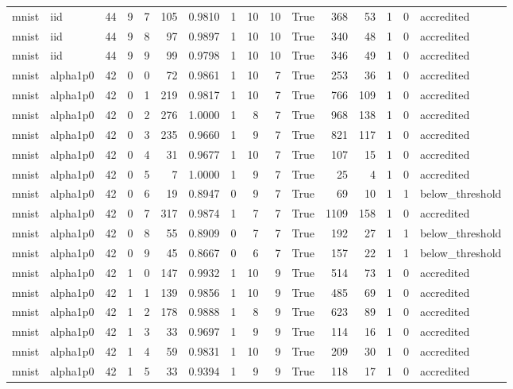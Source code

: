 \begin{tabular}{llrrrrrrrrrrrrrl}
mnist & iid & 44 & 9 & 7 & 105 & 0.9810 & 1 & 10 & 10 & True & 368 & 53 & 1 & 0 & accredited \\
mnist & iid & 44 & 9 & 8 & 97 & 0.9897 & 1 & 10 & 10 & True & 340 & 48 & 1 & 0 & accredited \\
mnist & iid & 44 & 9 & 9 & 99 & 0.9798 & 1 & 10 & 10 & True & 346 & 49 & 1 & 0 & accredited \\
mnist & alpha1p0 & 42 & 0 & 0 & 72 & 0.9861 & 1 & 10 & 7 & True & 253 & 36 & 1 & 0 & accredited \\
mnist & alpha1p0 & 42 & 0 & 1 & 219 & 0.9817 & 1 & 10 & 7 & True & 766 & 109 & 1 & 0 & accredited \\
mnist & alpha1p0 & 42 & 0 & 2 & 276 & 1.0000 & 1 & 8 & 7 & True & 968 & 138 & 1 & 0 & accredited \\
mnist & alpha1p0 & 42 & 0 & 3 & 235 & 0.9660 & 1 & 9 & 7 & True & 821 & 117 & 1 & 0 & accredited \\
mnist & alpha1p0 & 42 & 0 & 4 & 31 & 0.9677 & 1 & 10 & 7 & True & 107 & 15 & 1 & 0 & accredited \\
mnist & alpha1p0 & 42 & 0 & 5 & 7 & 1.0000 & 1 & 9 & 7 & True & 25 & 4 & 1 & 0 & accredited \\
mnist & alpha1p0 & 42 & 0 & 6 & 19 & 0.8947 & 0 & 9 & 7 & True & 69 & 10 & 1 & 1 & below\_threshold \\
mnist & alpha1p0 & 42 & 0 & 7 & 317 & 0.9874 & 1 & 7 & 7 & True & 1109 & 158 & 1 & 0 & accredited \\
mnist & alpha1p0 & 42 & 0 & 8 & 55 & 0.8909 & 0 & 7 & 7 & True & 192 & 27 & 1 & 1 & below\_threshold \\
mnist & alpha1p0 & 42 & 0 & 9 & 45 & 0.8667 & 0 & 6 & 7 & True & 157 & 22 & 1 & 1 & below\_threshold \\
mnist & alpha1p0 & 42 & 1 & 0 & 147 & 0.9932 & 1 & 10 & 9 & True & 514 & 73 & 1 & 0 & accredited \\
mnist & alpha1p0 & 42 & 1 & 1 & 139 & 0.9856 & 1 & 10 & 9 & True & 485 & 69 & 1 & 0 & accredited \\
mnist & alpha1p0 & 42 & 1 & 2 & 178 & 0.9888 & 1 & 8 & 9 & True & 623 & 89 & 1 & 0 & accredited \\
mnist & alpha1p0 & 42 & 1 & 3 & 33 & 0.9697 & 1 & 9 & 9 & True & 114 & 16 & 1 & 0 & accredited \\
mnist & alpha1p0 & 42 & 1 & 4 & 59 & 0.9831 & 1 & 10 & 9 & True & 209 & 30 & 1 & 0 & accredited \\
mnist & alpha1p0 & 42 & 1 & 5 & 33 & 0.9394 & 1 & 9 & 9 & True & 118 & 17 & 1 & 0 & accredited \\

\end{tabular}
